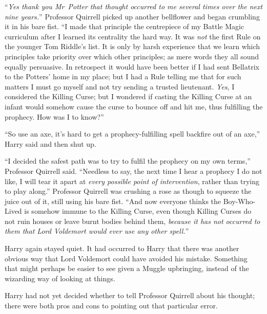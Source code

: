 “\emph{Yes thank you Mr~Potter that thought occurred to me several times over the next nine years.}” Professor Quirrell picked up another bellflower and began crumbling it in his bare fist. “I made that principle the centrepiece of my Battle Magic curriculum after I learned its centrality the hard way. It was \emph{not} the first Rule on the younger Tom Riddle’s list. It is only by harsh experience that we learn which principles take priority over which other principles; as mere words they all sound equally persuasive. In retrospect it would have been better if I had sent Bellatrix to the Potters’ home in my place; but I had a Rule telling me that for such matters I must go myself and not try sending a trusted lieutenant. \emph{Yes}, I considered the Killing Curse; but I wondered if casting the Killing Curse at an infant would somehow cause the curse to bounce off and hit me, thus fulfilling the prophecy. How was I to know?”

“So use an axe, it’s hard to get a prophecy-fulfilling spell backfire out of an axe,” Harry said and then shut up.

“I decided the safest path was to try to fulfil the prophecy on my own terms,” Professor Quirrell said. “Needless to say, the next time I hear a prophecy I do not like, I will tear it apart at \emph{every possible point of intervention}, rather than trying to play along.” Professor Quirrell was crushing a rose as though to squeeze the juice out of it, still using his bare fist. “And now everyone thinks the Boy-Who-Lived is somehow immune to the Killing Curse, even though Killing Curses do not ruin houses or leave burnt bodies behind them, \emph{because it has not occurred to them that Lord Voldemort would ever use any other spell.}”

Harry again stayed quiet. It had occurred to Harry that there was another obvious way that Lord Voldemort could have avoided his mistake. Something that might perhaps be easier to see given a Muggle upbringing, instead of the wizarding way of looking at things.

Harry had not yet decided whether to tell Professor Quirrell about his thought; there were both pros and cons to pointing out that particular error.

